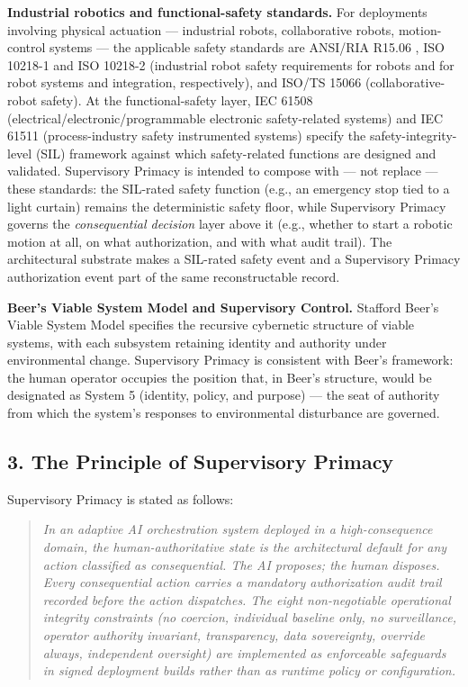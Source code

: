 \textbf{Industrial robotics and functional-safety standards.} For
deployments involving physical actuation --- industrial robots,
collaborative robots, motion-control systems --- the applicable safety
standards are ANSI/RIA R15.06 \cite{ref11}, ISO 10218-1 and ISO 10218-2
\cite{ref12} (industrial robot safety requirements for robots and for robot
systems and integration, respectively), and ISO/TS 15066 \cite{ref13}
(collaborative-robot safety). At the functional-safety layer, IEC 61508
(electrical/electronic/programmable electronic safety-related systems)
and IEC 61511 (process-industry safety instrumented systems) \cite{ref14}
specify the safety-integrity-level (SIL) framework against which
safety-related functions are designed and validated. Supervisory Primacy
is intended to compose with --- not replace --- these standards: the
SIL-rated safety function (e.g., an emergency stop tied to a light
curtain) remains the deterministic safety floor, while Supervisory
Primacy governs the \emph{consequential decision} layer above it (e.g.,
whether to start a robotic motion at all, on what authorization, and
with what audit trail). The architectural substrate makes a SIL-rated
safety event and a Supervisory Primacy authorization event part of the
same reconstructable record.

\textbf{Beer's Viable System Model and Supervisory Control.} Stafford
Beer's Viable System Model \cite{ref5} specifies the recursive cybernetic
structure of viable systems, with each subsystem retaining identity and
authority under environmental change. Supervisory Primacy is consistent
with Beer's framework: the human operator occupies the position that, in
Beer's structure, would be designated as System 5 (identity, policy, and
purpose) --- the seat of authority from which the system's responses to
environmental disturbance are governed.

\subsection{3. The Principle of Supervisory
Primacy}\label{the-principle-of-supervisory-primacy}

Supervisory Primacy is stated as follows:

\begin{quote}
\emph{In an adaptive AI orchestration system deployed in a
high-consequence domain, the human-authoritative state is the
architectural default for any action classified as consequential. The AI
proposes; the human disposes. Every consequential action carries a
mandatory authorization audit trail recorded before the action
dispatches. The eight non-negotiable operational integrity constraints
(no coercion, individual baseline only, no surveillance, operator
authority invariant, transparency, data sovereignty, override always,
independent oversight) are implemented as enforceable safeguards in
signed deployment builds rather than as runtime policy or
configuration.}
\end{quote}

